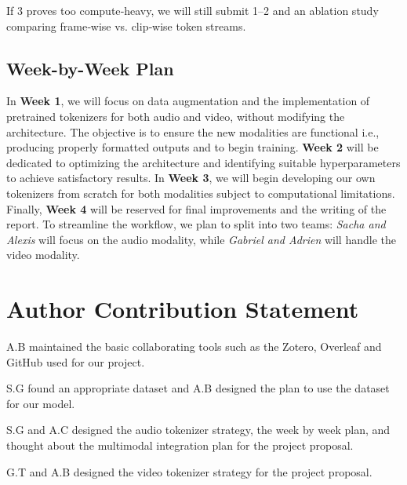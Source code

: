 \documentclass[10pt,conference,compsocconf]{IEEEtran}
\begin{document}
If 3 proves too compute‑heavy, we will still submit 1–2 and an
ablation study comparing frame‑wise vs. clip‑wise token streams.



\subsection{Week-by-Week Plan}
 In \textbf{Week 1}, we will focus on data augmentation and the implementation of pretrained tokenizers for both audio and video, without modifying the architecture. The objective is to ensure the new modalities are functional i.e., producing properly formatted outputs and to begin training. \textbf{Week 2} will be dedicated to optimizing the architecture and identifying suitable hyperparameters to achieve satisfactory results. In \textbf{Week 3}, we will begin developing our own tokenizers from scratch for both modalities subject to computational limitations. Finally, \textbf{Week 4} will be reserved for final improvements and the writing of the report. To streamline the workflow, we plan to split into two teams: \textit{Sacha and Alexis} will focus on the audio modality, while \textit{Gabriel and Adrien} will handle the video modality.


\section{Author Contribution Statement}
A.B maintained the basic collaborating tools such as the Zotero, Overleaf and GitHub used for our project.


S.G found an appropriate dataset and A.B designed the plan to use the dataset for our model.


S.G and A.C designed the audio tokenizer strategy, the week by week plan, and thought about the multimodal integration plan for the project proposal.


G.T and A.B designed the video tokenizer strategy for the project proposal.




\end{document}
